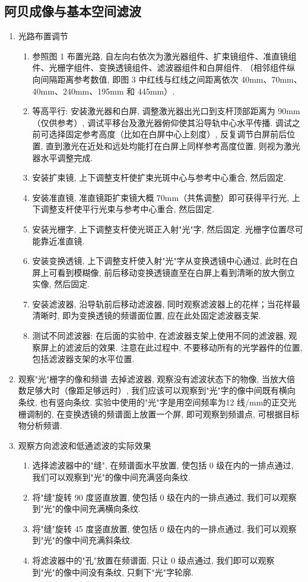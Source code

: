 \documentclass[zihao=5, UTF8]{article}
\theoremstyle{MyLineTheoremStyle} %
\theoremstyle{MyBlockTheoremStyle} %
\theoremstyle{MySubsubsectionStyle} %
\begin{document}
\subsection{阿贝成像与基本空间滤波}
\begin{enumerate}
    \item 光路布置调节
    \begin{enumerate}
        \item 参照图 1 布置光路, 自左向右依次为激光器组件、扩束镜组件、准直镜组件、光栅字组件、变换透镜组件、滤波器组件和白屏组件. （相邻组件纵向间隔距离参考数值, 即图 3 中红线与红线之间距离依次 40mm、70mm、40mm、240mm、195mm 和 445mm）. 
        \item 等高平行: 安装激光器和白屏, 调整激光器出光口到支杆顶部距离为 90mm（仅供参考）, 调试平移台及激光器俯仰使其沿导轨中心水平传播. 调试之前可选择固定参考高度（比如在白屏中心上刻度）, 反复调节白屏前后位置, 直到激光在近处和远处均能打在白屏上同样参考高度位置, 则视为激光器水平调整完成. 
        \item 安装扩束镜, 上下调整支杆使扩束光斑中心与参考中心重合, 然后固定. 
        \item 安装准直镜, 准直镜距扩束镜大概 70mm（共焦调整）即可获得平行光, 上下调整支杆使平行光束与参考中心重合, 然后固定. 
        \item 安装光栅字, 上下调整支杆使光斑正入射"光"字, 然后固定. 光栅字位置尽可能靠近准直镜. 
        \item 安装变换透镜, 上下调整支杆使入射"光"字从变换透镜中心通过, 此时在白屏上可看到模糊像, 前后移动变换透镜直至在白屏上看到清晰的放大倒立实像, 然后固定. 
        \item 安装滤波器, 沿导轨前后移动滤波器, 同时观察滤波器上的花样；当花样最清晰时, 即为变换透镜的频谱面位置, 应在此处固定滤波器支架. 
        \item 测试不同滤波器: 在后面的实验中, 在滤波器支架上使用不同的滤波器, 观察屏上的滤波后的效果. 注意在此过程中, 不要移动所有的光学器件的位置, 包括滤波器支架的水平位置. 
    \end{enumerate}
    \item 观察"光"栅字的像和频谱
    去掉滤波器, 观察没有滤波状态下的物像, 当放大倍数足够大时（像距足够远时）, 我们应该可以观察到"光"字的像中间既有横向条纹, 也有竖向条纹. 
    实验中使用的"光"字是用空间频率为12 线/mm的正交光栅调制的, 在变换透镜的频谱面上放置一个屏, 即可观察到频谱点, 可根据目标物分析频谱. 
    \item 观察方向滤波和低通滤波的实际效果
    \begin{enumerate}
        \item 选择滤波器中的"缝", 在频谱面水平放置, 使包括 0 级在内的一排点通过, 我们可以观察到"光"的像中间充满竖向条纹. 
        \item 将"缝"旋转 90 度竖直放置, 使包括 0 级在内的一排点通过, 我们可以观察到"光"的像中间充满横向条纹. 
        \item 将"缝"旋转 45 度竖直放置, 使包括 0 级在内的一排点通过, 我们可以观察到"光"的像中间充满斜条纹. 
        \item 将滤波器中的"孔"放置在频谱面, 只让 0 级点通过, 我们即可以观察到"光"的像中间没有条纹, 只剩下"光"字轮廓. 
    \end{enumerate}
\end{enumerate}
\end{document}
